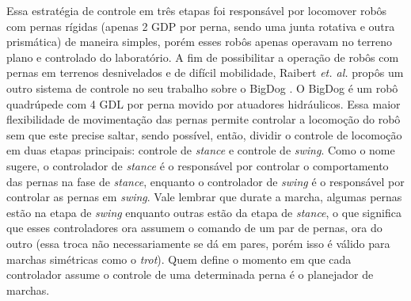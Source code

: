 \documentclass[../main.tex]{subfiles}
\begin{document}
  Essa estratégia de controle em três etapas foi responsável por locomover robôs com pernas rígidas (apenas 2 GDP por perna, sendo uma junta rotativa e outra prismática) de maneira simples, porém esses robôs apenas operavam no terreno plano e controlado do laboratório. A fim de possibilitar a operação de robôs com pernas em terrenos desnivelados e de difícil mobilidade, Raibert \textit{et. al.} propôs um outro sistema de controle no seu trabalho sobre o BigDog \cite{RAIBERT200810822}. O BigDog é um robô quadrúpede com 4 GDL por perna movido por atuadores hidráulicos. Essa maior flexibilidade de movimentação das pernas permite controlar a locomoção do robô sem que este precise saltar, sendo possível, então, dividir o controle de locomoção em duas etapas principais: controle de \textit{stance} e controle de \textit{\textit{swing}}. Como o nome sugere, o controlador de \textit{stance} é o responsável por controlar o comportamento das pernas na fase de \textit{stance}, enquanto o controlador de \textit{swing} é o responsável por controlar as pernas em \textit{swing}. Vale lembrar que durate a marcha, algumas pernas estão na etapa de \textit{swing} enquanto outras estão da etapa de \textit{stance}, o que significa que esses controladores ora assumem o comando de um par de pernas, ora do outro (essa troca não necessariamente se dá em pares, porém isso é válido para marchas simétricas como o \textit{trot}). Quem define o momento em que cada controlador assume o controle de uma determinada perna é o planejador de marchas.
\end{document}
